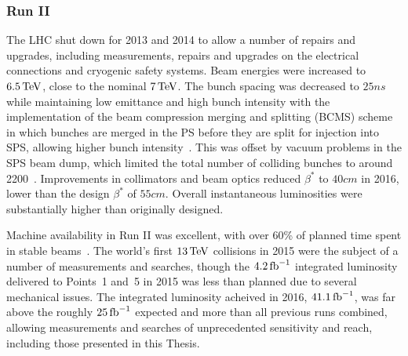 \subsubsection{Run II}
The LHC shut down for 2013 and 2014 to allow a number of repairs and upgrades, including measurements, repairs and upgrades on the electrical connections and cryogenic safety systems.
Beam energies were increased to $6.5\,\mathrm{Te\hspace{-.08em}V}$, close to the nominal $7\,\mathrm{Te\hspace{-.08em}V}$.
The bunch spacing was decreased to $25\unit{ns}$ while maintaining low emittance and high bunch intensity with the implementation of the beam compression merging and splitting (BCMS) scheme in which bunches are merged in the PS before they are split for injection into SPS, allowing higher bunch intensity~\cite{Papaphilippou:2014qwa}.
This was offset by vacuum problems in the SPS beam dump, which limited the total number of colliding bunches to around 2200~\cite{Frederick:2235979}.
Improvements in collimators and beam optics reduced $\beta^\ast$ to $40\unit{cm}$ in 2016, lower than the design $\beta^\ast$ of $55\unit{cm}$.
Overall instantaneous luminosities were substantially higher than originally designed.

Machine availability in Run II was excellent, with over 60\% of planned time spent in stable beams~\cite{Frederick:2235979}.
The world's first $13\,\mathrm{Te\hspace{-.08em}V}$ collisions in 2015 were the subject of a number of measurements and searches, though the $4.2\mbox{\ensuremath{\,\mathrm{fb}^{-1}}}$ integrated luminosity delivered to Points~1 and~5 in 2015 was less than planned due to several mechanical issues.
The integrated luminosity acheived in 2016, $41.1\mbox{\ensuremath{\,\mathrm{fb}^{-1}}}$, was far above the roughly $25\mbox{\ensuremath{\,\mathrm{fb}^{-1}}}$ expected and more than all previous runs combined, allowing measurements and searches of unprecedented sensitivity and reach, including those presented in this Thesis.




